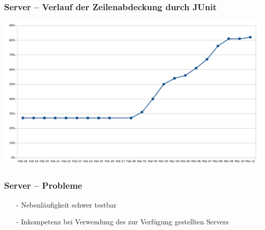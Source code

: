 \documentclass[aspectratio=1610]{beamer}
\begin{document}
	\begin{frame}[plain]
        \frametitle{\textbf{Server} -- Verlauf der Zeilenabdeckung durch JUnit}
        \includegraphics[width = \columnwidth]{images/test-coverage-graph.png}
  \end{frame}

  \begin{frame}[plain]
        \frametitle{\textbf{Server} -- Probleme}

        \begin{itemize}
          \item[-] Nebenläufigkeit schwer testbar
          \item[-] Inkompetenz bei Verwendung des zur Verfügung
                   gestellten Servers
        \end{itemize}
  \end{frame}
\end{document}
